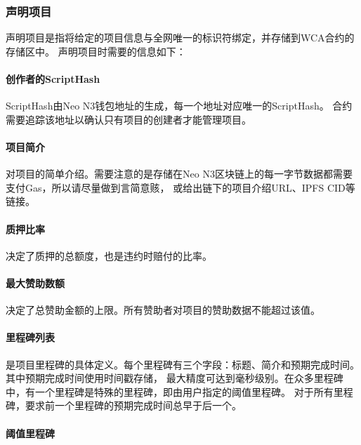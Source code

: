 \documentclass[11pt,UTF8,a4paper]{ctexart}
\begin{document}
    \subsubsection{声明项目}

    声明项目是指将给定的项目信息与全网唯一的标识符绑定，并存储到WCA合约的存储区中。
    声明项目时需要的信息如下：

    \paragraph{创作者的ScriptHash}

    ScriptHash由Neo N3钱包地址的生成，每一个地址对应唯一的ScriptHash。
    合约需要追踪该地址以确认只有项目的创建者才能管理项目。

    \paragraph{项目简介}

    对项目的简单介绍。需要注意的是存储在Neo N3区块链上的每一字节数据都需要支付Gas，所以请尽量做到言简意赅，
    或给出链下的项目介绍URL、IPFS CID等链接。

    \paragraph{质押比率}

    决定了质押的总额度，也是违约时赔付的比率。

    \paragraph{最大赞助数额}

    决定了总赞助金额的上限。所有赞助者对项目的赞助数据不能超过该值。

    \paragraph{里程碑列表}

    是项目里程碑的具体定义。每个里程碑有三个字段：标题、简介和预期完成时间。其中预期完成时间使用时间戳存储，
    最大精度可达到毫秒级别。在众多里程碑中，有一个里程碑是特殊的里程碑，即由用户指定的阈值里程碑。
    对于所有里程碑，要求前一个里程碑的预期完成时间总早于后一个。

    \paragraph{阈值里程碑}
\end{document}
